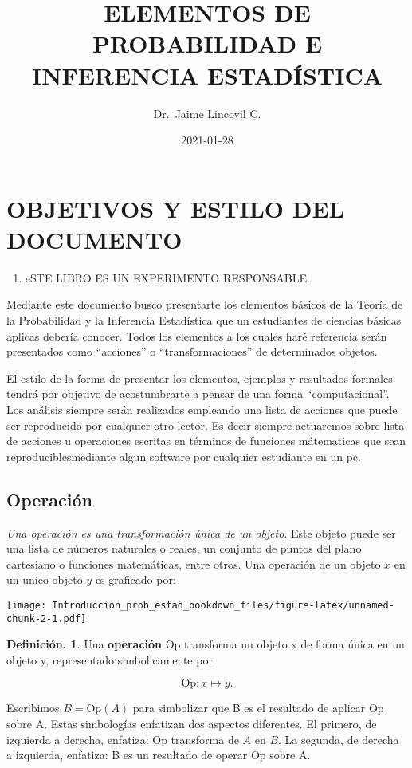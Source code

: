 \documentclass[]{book}
\title{ELEMENTOS DE PROBABILIDAD E INFERENCIA ESTADÍSTICA}
\author{Dr.~Jaime Lincovil C.}
\date{2021-01-28}
\providecommand{\tightlist}{%
  \setlength{\itemsep}{0pt}\setlength{\parskip}{0pt}}
\theoremstyle{definition}
\newtheorem{definition}{Definición.}[chapter]
\theoremstyle{definition}
\theoremstyle{definition}
\theoremstyle{remark}
\begin{document}
\maketitle

{
\setcounter{tocdepth}{1}
\tableofcontents
}
\hypertarget{objetivos-y-estilo-del-documento}{%
\chapter*{OBJETIVOS Y ESTILO DEL DOCUMENTO}\label{objetivos-y-estilo-del-documento}}

\begin{enumerate}
\def\labelenumi{\arabic{enumi}.}
\tightlist
\item
  eSTE LIBRO ES UN EXPERIMENTO RESPONSABLE.
\end{enumerate}

Mediante este documento busco presentarte los
elementos básicos de la Teoría de la Probabilidad y la
Inferencia Estadística que un estudiantes de ciencias básicas
aplicas debería conocer. Todos los elementos a los cuales haré
referencia serán presentados como ``acciones'' o
``transformaciones'' de determinados objetos.

El estilo de la forma de presentar los elementos, ejemplos y
resultados formales tendrá por objetivo de acostumbrarte a
pensar de una forma ``computacional''. Los análisis siempre
serán realizados empleando una lista de acciones que puede
ser reproducido por cualquier otro lector. Es decir siempre
actuaremos sobre lista de acciones u operaciones
escritas en términos de funciones mátematicas que sean
reproduciblesmediante algun software por cualquier estudiante
en un pc.

\hypertarget{operaciuxf3n}{%
\section*{Operación}\label{operaciuxf3n}}

\emph{Una operación es una transformación única de un
objeto}. Este objeto puede ser una lista de números naturales o
reales, un conjunto de puntos del plano cartesiano o funciones
matemáticas, entre otros. Una operación de un objeto \(x\) en un unico objeto \(y\) es graficado por:

\texttt{[image: Introduccion\_prob\_estad\_bookdown\_files/figure-latex/unnamed-chunk-2-1.pdf]}

\begin{definition}
\protect\hypertarget{def:unnamed-chunk-3}{}{\label{def:unnamed-chunk-3} }
Una \textbf{operación} Op transforma un objeto x de forma única en un
objeto y, representado simbolicamente por

\[\mbox{Op}: x \mapsto y. \]

Escribimos \(B = \mbox{Op}(A)\) para simbolizar que B es el
resultado de aplicar Op sobre A. Estas simbologías enfatizan dos
aspectos diferentes. El primero, de izquierda a derecha, enfatiza: Op
transforma de \(A\) en \(B\). La segunda, de derecha a izquierda, enfatiza: B es un resultado de operar Op sobre A.
\end{definition}
\end{document}
